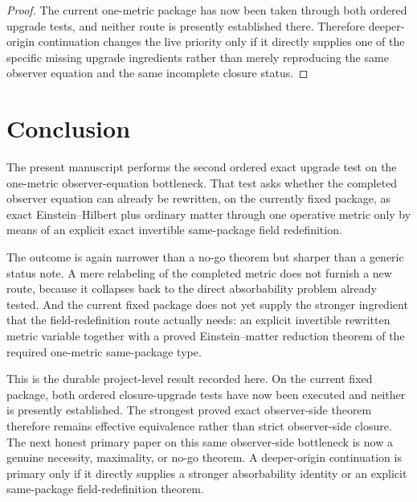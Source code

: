 \documentclass[11pt]{article}
\begin{document}
\begin{proof}
The current one-metric package has now been taken through both ordered upgrade tests, and neither route is presently established there. Therefore deeper-origin continuation changes the live priority only if it directly supplies one of the specific missing upgrade ingredients rather than merely reproducing the same observer equation and the same incomplete closure status.
\end{proof}

\section{Conclusion}

The present manuscript performs the second ordered exact upgrade test on the one-metric observer-equation bottleneck. That test asks whether the completed observer equation can already be rewritten, on the currently fixed package, as exact Einstein--Hilbert plus ordinary matter through one operative metric only by means of an explicit exact invertible same-package field redefinition.

The outcome is again narrower than a no-go theorem but sharper than a generic status note. A mere relabeling of the completed metric does not furnish a new route, because it collapses back to the direct absorbability problem already tested. And the current fixed package does not yet supply the stronger ingredient that the field-redefinition route actually needs: an explicit invertible rewritten metric variable together with a proved Einstein--matter reduction theorem of the required one-metric same-package type.

This is the durable project-level result recorded here. On the current fixed package, both ordered closure-upgrade tests have now been executed and neither is presently established. The strongest proved exact observer-side theorem therefore remains effective equivalence rather than strict observer-side closure. The next honest primary paper on this same observer-side bottleneck is now a genuine necessity, maximality, or no-go theorem. A deeper-origin continuation is primary only if it directly supplies a stronger absorbability identity or an explicit same-package field-redefinition theorem.
\end{document}
